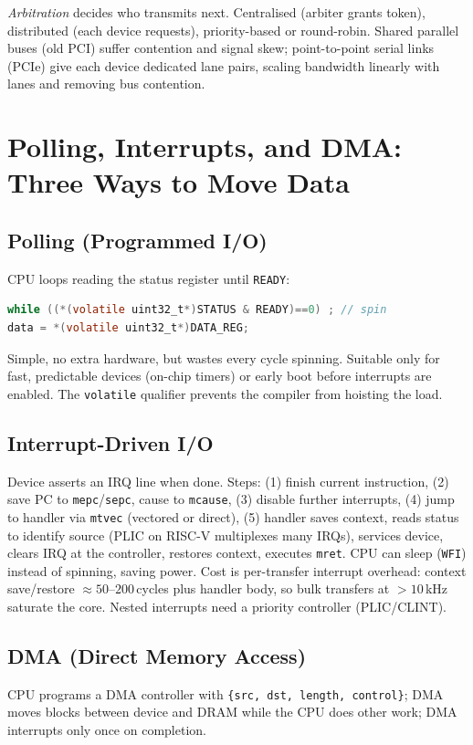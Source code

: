 \textit{Arbitration} decides who transmits next. Centralised (arbiter grants token), distributed (each device requests), priority-based or round-robin. Shared parallel buses (old PCI) suffer contention and signal skew; point-to-point serial links (PCIe) give each device dedicated lane pairs, scaling bandwidth linearly with lanes and removing bus contention.

\section{Polling, Interrupts, and DMA: Three Ways to Move Data}
\subsection{Polling (Programmed I/O)}
CPU loops reading the status register until \texttt{READY}:
\begin{lstlisting}[language=C]
while ((*(volatile uint32_t*)STATUS & READY)==0) ; // spin
data = *(volatile uint32_t*)DATA_REG;
\end{lstlisting}
Simple, no extra hardware, but wastes every cycle spinning. Suitable only for fast, predictable devices (on-chip timers) or early boot before interrupts are enabled. The \texttt{volatile} qualifier prevents the compiler from hoisting the load.

\subsection{Interrupt-Driven I/O}
Device asserts an IRQ line when done. Steps: (1) finish current instruction, (2) save PC to \texttt{mepc}/\texttt{sepc}, cause to \texttt{mcause}, (3) disable further interrupts, (4) jump to handler via \texttt{mtvec} (vectored or direct), (5) handler saves context, reads status to identify source (PLIC on RISC-V multiplexes many IRQs), services device, clears IRQ at the controller, restores context, executes \texttt{mret}. CPU can sleep (\texttt{WFI}) instead of spinning, saving power. Cost is per-transfer interrupt overhead: context save/restore $\approx 50$--$200$\,cycles plus handler body, so bulk transfers at $>10$\,kHz saturate the core. Nested interrupts need a priority controller (PLIC/CLINT).

\subsection{DMA (Direct Memory Access)}
CPU programs a DMA controller with \texttt{\{src, dst, length, control\}}; DMA moves blocks between device and DRAM while the CPU does other work; DMA interrupts only once on completion.

